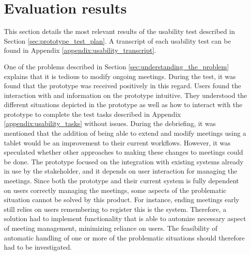 \section{Evaluation results}\label{sec:usability_evaluation_results}
This section details the most relevant results of the usability test described in Section \ref{sec:prototype_test_plan}.
A transcript of each usability test can be found in Appendix \ref{appendix:usability_transcript}.

One of the problems described in Section \ref{sec:understanding_the_problem} explains that it is tedious to modify ongoing meetings. 
During the test, it was found that the prototype was received positively in this regard. 
Users found the interaction with and information on the prototype intuitive. 
They understood the different situations depicted in the prototype as well as how to interact with the prototype to complete the test tasks described in Appendix \ref{appendix:usability_tasks} without issues.
During the debriefing, it was mentioned that the addition of being able to extend and modify meetings using a tablet would be an improvement to their current workflows.
However, it was speculated whether other approaches to making these changes to meetings could be done. 
The prototype focused on the integration with existing systems already in use by the stakeholder, and it depends on user interaction for managing the meetings.
Since both the prototype and their current system is fully dependent on users correctly managing the meetings, some aspects of the problematic situation cannot be solved by this product. 
For instance, ending meetings early still relies on users remembering to register this is the system. 
Therefore, a solution had to implement functionality that is able to automize necessary aspect of meeting management, minimizing reliance on users.
The feasibility of  automatic handling of one or more of the problematic situations should therefore had to be investigated.